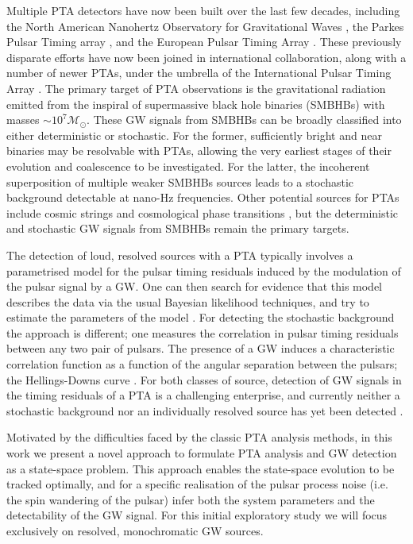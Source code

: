 \documentclass[fleqn,usenatbib,useAMS]{mnras}
\begin{document}
\noindent Multiple PTA detectors have now been built over the last few decades, including the North American Nanohertz Observatory for Gravitational Waves \citep[NANOGrav,][]{2020ApJ...905L..34A}, the Parkes Pulsar Timing array \citep[PPTA][]{2020PASA...37...20K}, and the European Pulsar Timing Array \citep[EPTA,][]{2010CQGra..27h4014F}. These previously disparate efforts have now been joined in international collaboration, along with a number of newer PTAs, under the umbrella of the International Pulsar Timing Array \citep[IPTA][]{2019MNRAS.490.4666P}. The primary target of PTA observations is the gravitational radiation emitted from the inspiral of supermassive black hole binaries (SMBHBs) with masses $\sim\mathcal{ 10^7 M_{\odot}}$. These GW signals from SMBHBs can be broadly classified into either deterministic or stochastic. For the former, sufficiently bright and near binaries may be resolvable with PTAs, allowing the very earliest stages of their evolution and coalescence to be investigated. For the latter, the incoherent superposition of multiple weaker SMBHBs sources leads to a stochastic background detectable at nano-Hz frequencies. Other potential sources for PTAs include cosmic strings \citep[e.g.][]{PTAstring} and cosmological phase transitions \citep[e.g.][]{PTAphase}, but the deterministic and stochastic GW signals from SMBHBs remain the primary targets. \newline 



\noindent The detection of loud, resolved sources with a PTA typically involves a parametrised model for the pulsar timing residuals induced by the modulation of the pulsar signal by a GW. One can then search for evidence that this model describes the data via the usual Bayesian likelihood techniques, and try to estimate the parameters of the model \citep[e.g.][]{Babak2016}. For detecting the stochastic background the approach is different; one measures the correlation in pulsar timing residuals between any two pair of pulsars. The presence of a GW induces a characteristic correlation function as a function of the angular separation between the pulsars; the Hellings-Downs curve \citep{Hellings}. For both classes of source, detection of GW signals in the timing residuals of a PTA is a challenging enterprise, and currently neither a stochastic background nor an individually resolved source has yet been detected \citep{2022MNRAS.510.4873A, 10.1093/nsr/nwx126}. \newline 


\noindent Motivated by the difficulties faced by the classic PTA analysis methods, in this work we present a novel approach to formulate PTA analysis and GW detection as a state-space problem. This approach enables the state-space evolution to be tracked optimally, and for a specific realisation of the pulsar process noise (i.e. the spin wandering of the pulsar) infer both the system parameters and the detectability of the GW signal. For this initial exploratory study we will focus exclusively on resolved, monochromatic GW sources. 
\end{document}
